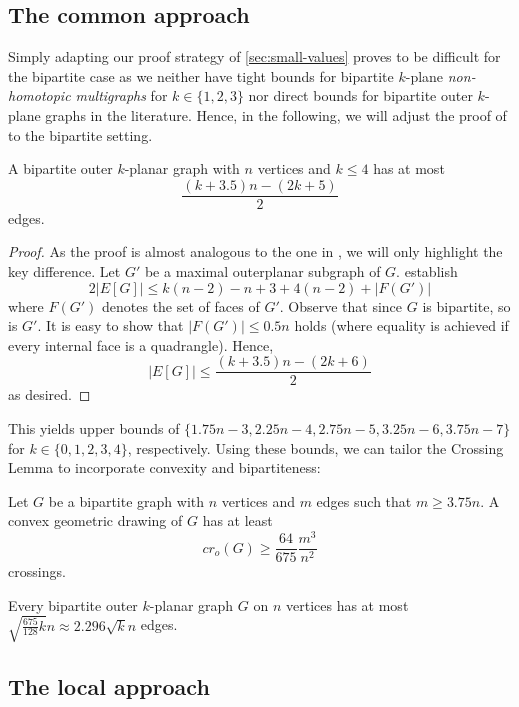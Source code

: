 \documentclass[nolineno,a4paper,USenglish,cleveref,autoref,thm-restate]
{socg}
\begin{document}
\subsection{The common approach}
 Simply adapting our proof strategy of \cref{sec:small-values} proves to be difficult for the bipartite case as we neither have tight bounds for bipartite $k$-plane \emph{non-homotopic multigraphs} for $k \in \{1,2,3\}$ nor direct bounds for bipartite outer $k$-plane graphs in the literature. Hence, in the following, we will adjust the proof of \cite[Proposition $5$]{DBLP:conf/compgeom/AichholzerOOPSS22} to the bipartite setting. 
\begin{theorem}\label{thm:small-k-bip}
    A bipartite outer $k$-planar graph with $n$ vertices and $k \leq 4$ has at most 
    \[\frac{(k+3.5)n - (2k+5)}{2}\]
  edges.
\end{theorem}
\begin{proof}
    As the proof is almost analogous to the one in \cite{DBLP:conf/compgeom/AichholzerOOPSS22}, we will only highlight the key difference.
    Let $G'$ be a maximal outerplanar subgraph of $G$. \cite{DBLP:conf/compgeom/AichholzerOOPSS22} establish
    \[
    2|E[G]| \leq k(n-2)-n+3+4(n-2)+|F(G')|
    \] where $F(G')$ denotes the set of faces of $G'$.
    Observe that since $G$ is bipartite, so is $G'$. 
    It is easy to show that $|F(G')| \leq 0.5n$ holds (where equality is achieved if every internal face is a quadrangle).
    Hence, 
     \[
    |E[G]| \leq \frac{(k+3.5)n - (2k+6)}{2}
    \] 
    as desired.
\end{proof}
This yields upper bounds of $\{1.75n-3, 2.25n-4, 2.75n-5, 3.25n-6, 3.75n-7\}$ for $k \in \{0,1,2,3,4\}$, respectively.
Using these bounds, we can tailor the Crossing Lemma to incorporate convexity and bipartiteness:
\begin{lemma}
Let $G$ be a bipartite graph with $n$ vertices and $m$ edges such that $m \geq 3.75n$. A convex geometric drawing of $G$ has at least
\[cr_o(G) \geq \frac{64}{675}\frac{m^3}{n^2}\]
crossings.
\end{lemma}
\begin{theorem}\label{thm:edge-density-second-bipartite}
Every bipartite outer $k$-planar graph $G$ on $n$ vertices has at most $\sqrt{\frac{675}
{128}k}n \approx 2.296\sqrt{k}n$ edges.
\end{theorem}



\subsection{The local approach}
\end{document}
